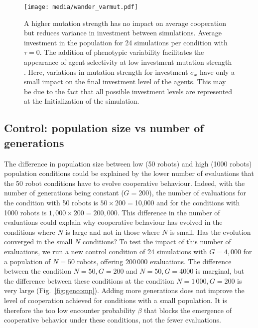 \documentclass[letterpaper]{article}
\begin{document}
\begin{figure}[tbhp]
    \begin{center}
        \texttt{[image: media/wander\_varmut.pdf]}
        \vskip 0.25cm
        \caption{A higher mutation strength has no impact on average cooperation but reduces variance in investment between simulations.
        Average investment in the population for 24 simulations per condition with $\tau = 0$. The addition of phenotypic variability facilitates the appearance of agent selectivity at low investment mutation strength \citep{McNamara2010c}. Here, variations in mutation strength for investment $\sigma_x$ %
        have only a small impact on the final investment level of the agents. This may be due to the fact that all possible investment levels are represented at the Initialization of the simulation.
        }
    \label{fig:varmut}
    \end{center}
\end{figure}



\subsection{Control: population size vs number of generations}

The difference in population size between low (50 robots) and high (1000 robots) population conditions could be explained by the lower number of evaluations that the 50 robot conditions have to evolve cooperative behaviour. Indeed, with the number of generations being constant ($G = 200$), the number of evaluations for the condition with 50 robots is $50 \times 200 = $10,000 and for the conditions with 1000 robots is $1,000 \times 200 = 200,000$. This difference in the number of evaluations could explain why cooperative behaviour has evolved in the conditions where $N$ is large and not in those where $N$ is small. Has the evolution converged in the small $N$ conditions? %
To test the impact of this number of evaluations, we run a new control condition of 24 simulations with $G = 4,000$ for a population of $N=50$ robots, offering $200\,000$ evaluations. %
The difference between the condition $N=50, G=200$ and $N=50, G=4000$ is marginal, but the difference between these conditions at the condition $N=1\,000, G=200$ is very large (Fig.~\ref{fig:gencomp}). Adding more generations does not improve the level of cooperation achieved for conditions with a small population. %
It is therefore the too low encounter probability $\beta$ that blocks the emergence of cooperative behavior under these conditions, not the fewer evaluations. %
\end{document}
